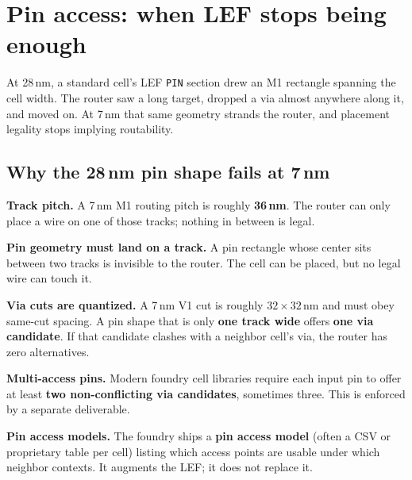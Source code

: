 \section{Pin access: when LEF stops being enough}

At 28\,nm, a standard cell's LEF \texttt{PIN} section drew an M1 rectangle spanning the cell width. The router saw a long target, dropped a via almost anywhere along it, and moved on. At 7\,nm that same geometry strands the router, and placement legality stops implying routability.

\subsection{Why the 28\,nm pin shape fails at 7\,nm}

 \textbf{Track pitch.} A 7\,nm M1 routing pitch is roughly \textbf{36\,nm}. The router can only place a wire on one of those tracks; nothing in between is legal.

 \textbf{Pin geometry must land on a track.} A pin rectangle whose center sits between two tracks is invisible to the router. The cell can be placed, but no legal wire can touch it.

 \textbf{Via cuts are quantized.} A 7\,nm V1 cut is roughly $32 \times 32$\,nm and must obey same-cut spacing. A pin shape that is only \textbf{one track wide} offers \textbf{one via candidate}. If that candidate clashes with a neighbor cell's via, the router has zero alternatives.

 \textbf{Multi-access pins.} Modern foundry cell libraries require each input pin to offer at least \textbf{two non-conflicting via candidates}, sometimes three. This is enforced by a separate deliverable.

 \textbf{Pin access models.} The foundry ships a \textbf{pin access model} (often a CSV or proprietary table per cell) listing which access points are usable under which neighbor contexts. It augments the LEF; it does not replace it.

